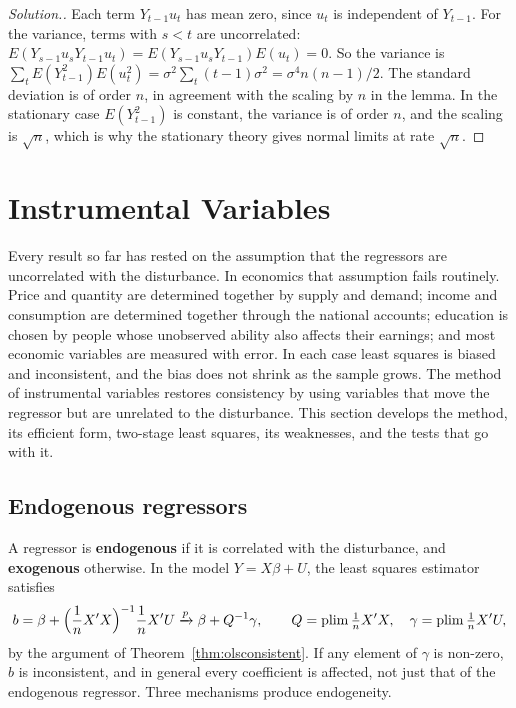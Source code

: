 \documentclass[11pt,a4paper]{article}
\numberwithin{equation}{section}
\DeclareMathOperator{\plim}{plim}
\theoremstyle{definition}
\newenvironment{solution}
  {\renewcommand{\qedsymbol}{}\begin{proof}[\textit{Solution}.]}
  {\end{proof}}
\begin{document}
\begin{solution}
Each term $Y_{t-1}u_t$ has mean zero, since $u_t$ is independent of $Y_{t-1}$. For the variance, terms with $s < t$ are uncorrelated:
$E(Y_{s-1}u_sY_{t-1}u_t) = E(Y_{s-1}u_sY_{t-1})E(u_t) = 0$. So the variance is $\sum_tE(Y_{t-1}^2)E(u_t^2) = \sigma^2\sum_t(t - 1)\sigma^2 = \sigma^4n(n - 1)/2$. The standard deviation is of order $n$,
in agreement with the scaling by $n$ in the lemma. In the stationary case $E(Y_{t-1}^2)$ is constant, the variance is of order $n$, and the scaling is $\sqrt n$, which is
why the stationary theory gives normal limits at rate $\sqrt n$.
\end{solution}

\section{Instrumental Variables}
\label{sec:iv}

Every result so far has rested on the assumption that the regressors are uncorrelated with the disturbance. In economics that assumption fails
routinely. Price and quantity are determined together by supply and demand; income and consumption are determined together through the national
accounts; education is chosen by people whose unobserved ability also affects their earnings; and most economic variables are measured with error.
In each case least squares is biased and inconsistent, and the bias does not shrink as the sample grows. The method of instrumental variables
restores consistency by using variables that move the regressor but are unrelated to the disturbance. This section develops the method, its
efficient form, two-stage least squares, its weaknesses, and the tests that go with it.

\subsection{Endogenous regressors}
\label{ssec:endog}

A regressor is \textbf{endogenous} if it is correlated with the disturbance, and \textbf{exogenous} otherwise. In the model $Y = X\beta + U$, the least squares estimator
satisfies
\[
b = \beta + \Bigl(\frac1nX'X\Bigr)^{-1}\frac1nX'U \xrightarrow{p} \beta + Q^{-1}\gamma, \qquad Q = \plim\tfrac1nX'X, \quad \gamma = \plim\tfrac1nX'U ,
\]
by the argument of Theorem~\ref{thm:olsconsistent}. If any element of $\gamma$ is non-zero, $b$ is inconsistent, and in general every coefficient is affected, not just
that of the endogenous regressor. Three mechanisms produce endogeneity.
\end{document}
